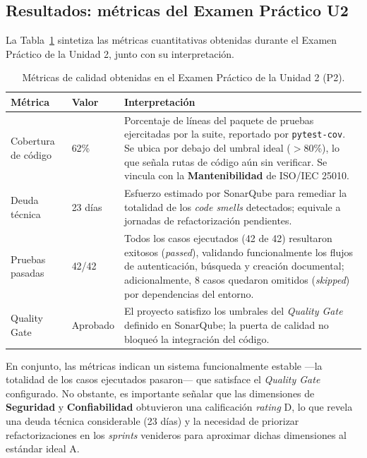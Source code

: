 \documentclass[11pt,letterpaper]{article}
\begin{document}
\subsection*{Resultados: m\'etricas del Examen Pr\'actico U2}

La Tabla~\ref{tab:metricas-p2} sintetiza las m\'etricas cuantitativas obtenidas
durante el Examen Pr\'actico de la Unidad 2, junto con su interpretaci\'on.

\begin{table}[H]
\centering
\caption{M\'etricas de calidad obtenidas en el Examen Pr\'actico de la Unidad 2 (P2).}
\label{tab:metricas-p2}
\begin{tabular}{|p{3.1cm}|p{2.4cm}|p{8.4cm}|}
\hline
\textbf{M\'etrica} & \textbf{Valor} & \textbf{Interpretaci\'on} \\
\hline
Cobertura de c\'odigo & 62\% &
Porcentaje de l\'ineas del paquete de pruebas ejercitadas por la suite,
reportado por \texttt{pytest-cov}. Se ubica por debajo del umbral ideal
($>$80\%), lo que se\~nala rutas de c\'odigo a\'un sin verificar. Se vincula con
la \textbf{Mantenibilidad} de ISO/IEC 25010. \\
\hline
Deuda t\'ecnica & 23 d\'ias &
Esfuerzo estimado por SonarQube para remediar la totalidad de los
\textit{code smells} detectados; equivale a jornadas de refactorizaci\'on
pendientes. \\
\hline
Pruebas pasadas & 42/42 &
Todos los casos ejecutados (42 de 42) resultaron exitosos (\textit{passed}),
validando funcionalmente los flujos de autenticaci\'on, b\'usqueda y creaci\'on
documental; adicionalmente, 8 casos quedaron omitidos (\textit{skipped}) por
dependencias del entorno. \\
\hline
Quality Gate & Aprobado &
El proyecto satisfizo los umbrales del \textit{Quality Gate} definido en
SonarQube; la puerta de calidad no bloque\'o la integraci\'on del c\'odigo. \\
\hline
\end{tabular}
\end{table}

En conjunto, las m\'etricas indican un sistema funcionalmente estable ---la
totalidad de los casos ejecutados pasaron--- que satisface el \textit{Quality
Gate} configurado. No obstante, es importante se\~nalar que las dimensiones de
\textbf{Seguridad} y \textbf{Confiabilidad} obtuvieron una calificaci\'on
\textit{rating} D, lo que revela una deuda t\'ecnica considerable (23 d\'ias) y
la necesidad de priorizar refactorizaciones en los \textit{sprints} venideros
para aproximar dichas dimensiones al est\'andar ideal A.
\end{document}
